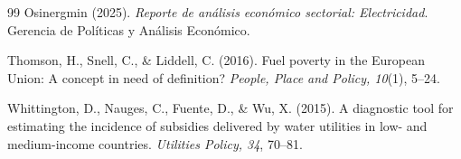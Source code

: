 \documentclass[11pt,a4paper]{article}
\begin{document}
\begin{thebibliography}{99}
 Osinergmin (2025). \textit{Reporte
de an\'alisis econ\'omico sectorial: Electricidad}. Gerencia de Pol\'iticas y
An\'alisis Econ\'omico.

 Thomson, H., Snell, C., \& Liddell,
C. (2016). Fuel poverty in the European Union: A concept in need of definition?
\textit{People, Place and Policy, 10}(1), 5--24.

 Whittington, D., Nauges,
C., Fuente, D., \& Wu, X. (2015). A diagnostic tool for estimating the
incidence of subsidies delivered by water utilities in low- and medium-income
countries. \textit{Utilities Policy, 34}, 70--81.

\end{thebibliography}
\end{document}

